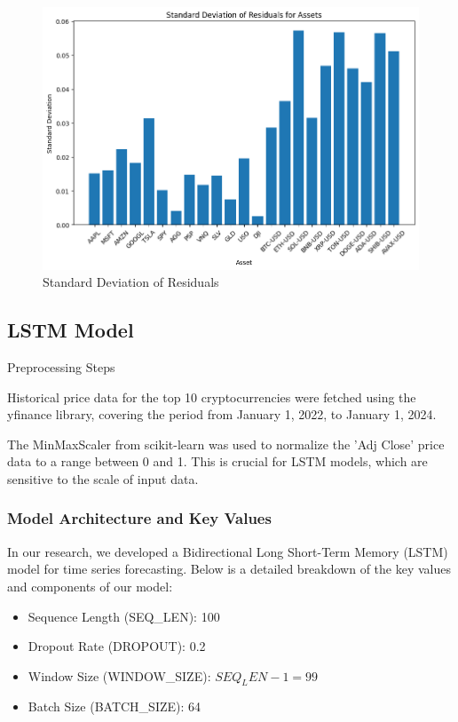 \begin{figure}
    \centering
    \includegraphics[width=\textwidth]{code/volatility-analysis/garch-with-mulit-assets/standard_deviation.png}
    \caption{Standard Deviation of Residuals}
    \label{fig:exp_return}
\end{figure}

\subsection{LSTM Model}

Preprocessing Steps

Historical price data for the top 10 cryptocurrencies were fetched using the yfinance library, covering the period from January 1, 2022, to January 1, 2024.

The MinMaxScaler from scikit-learn\cite{scikit-learn} was used to normalize the 'Adj Close' price data to a range between 0 and 1. This is crucial for LSTM models, which are sensitive to the scale of input data.

\subsubsection{Model Architecture and Key Values}

In our research, we developed a Bidirectional Long Short-Term Memory (LSTM) model for time series forecasting. Below is a detailed breakdown of the key values and components of our model:

\begin{itemize}
    \item {Sequence Length (SEQ\_LEN)}: 100
    \item {Dropout Rate (DROPOUT)}: 0.2
    \item {Window Size (WINDOW\_SIZE)}: \(SEQ_LEN - 1 = 99\)
    \item {Batch Size (BATCH\_SIZE)}: 64
\end{itemize}

